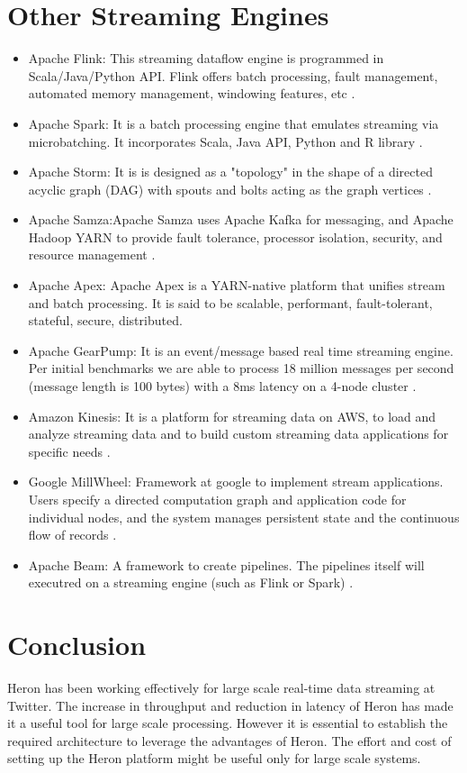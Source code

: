 \documentclass[9pt,twocolumn,twoside]{styles/osajnl}
\begin{document}
\section{Other Streaming Engines}
\begin{itemize}
    \item Apache Flink: This streaming dataflow engine is programmed in Scala/Java/Python API. Flink offers batch processing, fault management, automated memory management, windowing features, etc \cite{www-StreamingTechs}.
    \item Apache Spark: It is a batch processing engine that emulates streaming via microbatching. It incorporates Scala, Java API, Python and R library \cite{www-StreamingTechs}.
    \item Apache Storm: It is is designed as a "topology" in the shape of a directed acyclic graph (DAG) with spouts and bolts acting as the graph vertices \cite{TwitterHeron6}.
    \item Apache Samza:Apache Samza uses Apache Kafka for messaging, and Apache Hadoop YARN to provide fault tolerance, processor isolation, security, and resource management \cite{www-ApacheSamza}.
    \item Apache Apex: Apache Apex is a YARN-native platform that unifies stream and batch processing. It is said to be scalable, performant, fault-tolerant, stateful, secure, distributed.
    \item Apache GearPump: It is an event/message based real time streaming engine. Per initial benchmarks we are able to process 18 million messages per second (message length is 100 bytes) with a 8ms latency on a 4-node cluster \cite{www-Gearpump}.
    \item Amazon Kinesis: It is a platform for streaming data on AWS, to load and analyze streaming data and to build custom streaming data applications for specific needs \cite{www-Kinesis}.
    \item Google MillWheel: Framework at google to implement stream applications. Users specify a directed computation graph and application code for individual nodes, and the system manages persistent state and the continuous flow of records \cite{GoogleMillwheel}.
    \item Apache Beam: A framework to create pipelines. The pipelines itself will executred on a streaming engine (such as Flink or Spark) \cite{www-StreamingTechs}.
\end{itemize}
\section{Conclusion}
Heron has been working effectively for large scale real-time data streaming at Twitter. The increase in throughput and reduction in latency of Heron has made it a useful tool for large scale processing. However it is essential to establish the required architecture to leverage the advantages of Heron. The effort and cost of setting up the Heron platform might be useful only for large scale systems. 


\end{document}
